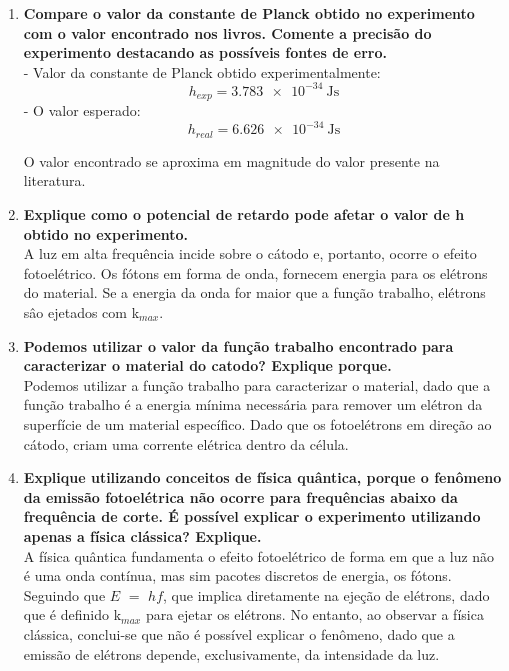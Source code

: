 \documentclass[conference]{IEEEtran}
\begin{document}
\begin{enumerate}
    \item \textbf{Compare o valor da constante de Planck obtido no experimento com o valor encontrado nos livros. Comente a precisão do experimento destacando as possíveis fontes de erro.}\\

    - Valor da constante de Planck obtido experimentalmente:
    \textbf{\[ h_{exp} = \SI{3.783e-34}{\joule\second} \]}
    - O valor esperado:
    \[ h_{real} = \SI{6.626e-34}{\joule\second} \]

    O valor encontrado se aproxima em magnitude do valor presente na literatura.\\
    
    \item \textbf{Explique como o potencial de retardo pode afetar o valor de h obtido no experimento.}\\

    A luz em alta frequência incide sobre o cátodo e, portanto, ocorre o efeito fotoelétrico. Os fótons em forma de onda, fornecem energia para os elétrons do material. Se a energia da onda for maior que a função trabalho, elétrons sâo ejetados com k$_{max}$.\\

    \item \textbf{Podemos utilizar o valor da função trabalho encontrado para caracterizar o material do catodo? Explique porque.}\\

    Podemos utilizar a função trabalho para caracterizar o material, dado que a função trabalho é a energia mínima necessária para remover um elétron da superfície de um material específico. Dado que os fotoelétrons em direção ao cátodo, criam uma corrente elétrica dentro da célula.\\

    \item \textbf{Explique utilizando conceitos de física quântica, porque o fenômeno da emissão fotoelétrica não ocorre para frequências abaixo da frequência de corte. É possível explicar o experimento utilizando apenas a física clássica? Explique.}\\

    A física quântica fundamenta o efeito fotoelétrico de forma em que a luz não é uma onda contínua, mas sim pacotes discretos de energia, os fótons. Seguindo que $E$ $=$ $hf$, que implica diretamente na ejeção de elétrons, dado que é definido k$_{max}$ para ejetar os elétrons.
    No entanto, ao observar a física clássica, conclui-se que não é possível explicar o fenômeno, dado que a emissão de elétrons depende, exclusivamente, da intensidade da luz.\\


\end{enumerate}
\end{document}
